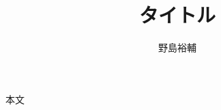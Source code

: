 \documentclass{jsarticle}
\title{タイトル}
\author{野島裕輔}
\begin{document}
\maketitle

本文

\bigskip

\end{document}
